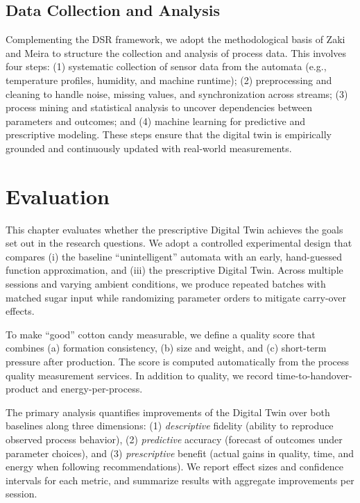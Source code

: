 \subsection*{Data Collection and Analysis}
Complementing the DSR framework, we adopt the methodological basis of Zaki and Meira \cite{Zaki2020} to structure the collection and analysis of process data. This involves four steps: (1) systematic collection of sensor data from the automata (e.g., temperature profiles, humidity, and machine runtime); (2) preprocessing and cleaning to handle noise, missing values, and synchronization across streams; (3) process mining and statistical analysis to uncover dependencies between parameters and outcomes; and (4) machine learning for predictive and prescriptive modeling. These steps ensure that the digital twin is empirically grounded and continuously updated with real-world measurements.


\section{Evaluation}
\label{sec:intro:ev}

This chapter evaluates whether the prescriptive Digital Twin achieves the goals set out in the research questions. We adopt a controlled experimental design that compares (i) the baseline ``unintelligent'' automata with an early, hand-guessed function approximation, and (iii) the prescriptive Digital Twin. Across multiple sessions and varying ambient conditions, we produce repeated batches with matched sugar input while randomizing parameter orders to mitigate carry-over effects.

To make ``good'' cotton candy measurable, we define a quality score that combines (a) formation consistency, (b) size and weight, and (c) short-term pressure after production. The score is computed automatically from the process quality measurement services. In addition to quality, we record time-to-handover-product and energy-per-process.

The primary analysis quantifies improvements of the Digital Twin over both baselines along three dimensions: (1) \emph{descriptive} fidelity (ability to reproduce observed process behavior), (2) \emph{predictive} accuracy (forecast of outcomes under parameter choices), and (3) \emph{prescriptive} benefit (actual gains in quality, time, and energy when following recommendations). We report effect sizes and confidence intervals for each metric, and summarize results with aggregate improvements per session.

